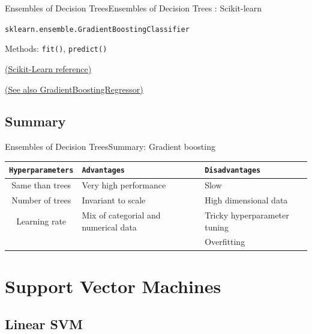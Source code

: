 \documentclass[10pt,compress]{beamer} %
\begin{document}
{\begin{frame}{Ensembles of Decision Trees}{Ensembles of Decision Trees : Scikit-learn}
\begin{exampleblock}{\texttt{sklearn.ensemble.GradientBoostingClassifier}}
            \medskip

            Methods: \texttt{fit()}, \texttt{predict()}
        \end{exampleblock}

        \medskip

        \centering \href{https://scikit-learn.org/stable/modules/generated/sklearn.ensemble.GradientBoostingClassifier.html}{(Scikit-Learn reference)}

        \href{https://scikit-learn.org/stable/modules/generated/sklearn.ensemble.GradientBoostingRegressor.html}{(See also GradientBoostingRegressor)}
    \end{frame}
}{}


\subsection{Summary}
\begin{frame}{Ensembles of Decision Trees}{Summary: Gradient boosting}
	\begin{center}
	\begin{tabular}{cp{3cm}p{3cm}}\hline
	 	\texttt{Hyperparameters}  & \texttt{Advantages}  & \texttt{Disadvantages} \\\hline
	 	Same than trees           & Very high performance& Slow  \\
	 	Number of trees           & Invariant to scale   & High dimensional data  \\
	 	Learning rate             & Mix of categorial and numerical data & Tricky hyperparameter tuning  \\
	 	                          &                      & Overfitting  \\
	 	\hline
	\end{tabular}
	\end{center}
\end{frame}

\section{Support Vector Machines}
\subsection{Linear SVM}
\end{document}
